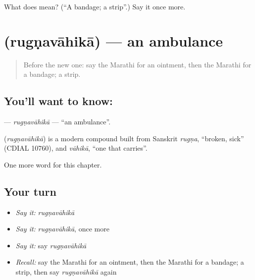 \begin{tcolorbox}[breakable,colback=teal!4,colframe=teal!35!black,title={Before you move on}]
What does  mean? (\textquotedblleft{}A bandage; a strip\textquotedblright{}.) Say it once more.
\end{tcolorbox}
\section[\texorpdfstring{\mr{रुग्णवाहिका} (rugṇavāhikā)}{रुग्णवाहिका (rugṇavāhikā)}]{ (rugṇavāhikā) — an ambulance}

\label{lesson:MR-C229-rugnavahika}



\begin{quote}
Before the new one: say the Marathi for an ointment, then the Marathi for a bandage; a strip.
\end{quote}

\subsection*{You'll want to know: }
\textbf{} — \emph{rugṇavāhikā} — \textquotedblleft{}an ambulance\textquotedblright{}.

\begin{cousinweb}
\textbf{} (\emph{rugṇavāhikā}) is a modern compound built from Sanskrit \emph{rugṇa}, \textquotedblleft{}broken, sick\textquotedblright{} (CDIAL 10760), and \emph{vāhikā}, \textquotedblleft{}one that carries\textquotedblright{}.
\end{cousinweb}

\begin{grammarlens}[title={What you've built}]
One more word for this chapter.
\end{grammarlens}

\subsection*{Your turn}
\begin{itemize}
\raggedright
  \item \emph{Say it:} \emph{rugṇavāhikā}
  \item \emph{Say it:} \emph{rugṇavāhikā}, once more
  \item \emph{Say it:} say \emph{rugṇavāhikā}
  \item \emph{Recall:} say the Marathi for an ointment, then the Marathi for a bandage; a strip, then say \emph{rugṇavāhikā} again
\end{itemize}

